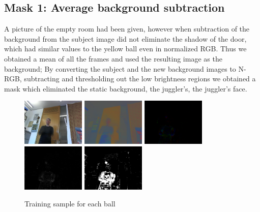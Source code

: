 \documentclass[10pt,a4paper,oneclumn]{article}
\begin{document}
\subsection{Mask 1: Average background subtraction}

A picture of the empty room had been given, however when subtraction of the background from the subject image did not eliminate the shadow of the door, which had similar values to the yellow ball even in normalized RGB. Thus we obtained a mean of all the frames and used the resulting image as the background; By converting the subject and the new background images to N-RGB, subtracting and thresholding out the low brightness regions we obtained a mask which eliminated the static background, the juggler's, the juggler's face.

\begin{figure}[h!]
\centering
  \includegraphics[width=3cm]{figures/av.png}
  \includegraphics[width=3cm]{figures/avnrgb.png}
  \includegraphics[width=3cm]{figures/avnrgbdif.png}
  \includegraphics[width=3cm]{figures/avnrgbhsvvalue.png}
  \includegraphics[width=3cm]{figures/avnrgbdifhsvmask.png}
\caption{Training sample for each ball}
\end{figure}
\end{document}
